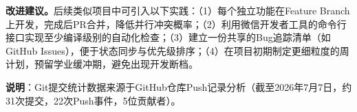 \documentclass[a4paper,12pt]{article}
\begin{document}
\textbf{改进建议。}后续类似项目中可引入以下实践：（1）每个独立功能在Feature Branch上开发，完成后PR合并，降低并行冲突概率；（2）利用微信开发者工具的命令行接口实现至少编译级别的自动化检查；（3）建立一份共享的Bug追踪清单（如GitHub Issues），便于状态同步与优先级排序；（4）在项目初期制定更细粒度的周计划，预留学业缓冲期，避免出现开发断档。

\vspace{1cm}
\begin{flushright}
\begin{minipage}{0.6\textwidth}
\textbf{说明}：Git提交统计数据来源于GitHub仓库Push记录分析（截至2026年7月7日，约31次提交，22次Push事件，5位贡献者）。
\end{minipage}
\end{flushright}
\end{document}
